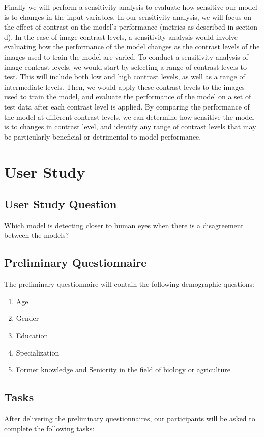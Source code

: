 \documentclass{article}
\begin{document}
Finally we will perform a sensitivity analysis to evaluate how sensitive our model is to changes in the input variables. In our sensitivity analysis, 
we will focus on the effect of contrast on the model’s performance (metrics as described in section d).
In the case of image contrast levels, a sensitivity analysis would involve evaluating how the performance of 
the model changes as the contrast levels of the images used to train the model are varied.
To conduct a sensitivity analysis of image contrast levels, we would start by selecting a range of contrast levels to test. 
This will include both low and high contrast levels, as well as a range of intermediate levels. 
Then, we would apply these contrast levels to the images used to train the model, and evaluate the performance of the model on a set of test data after each contrast level is applied.
By comparing the performance of the model at different contrast levels, we can determine how sensitive the model is to changes in contrast level, 
and identify any range of contrast levels that may be particularly beneficial or detrimental to model performance.

\newpage
\section{User Study}

\subsection{User Study Question}
Which model is detecting closer to human eyes when there is a disagreement between the models? 

\subsection{Preliminary Questionnaire}
The preliminary questionnaire will contain the following demographic questions: 

\begin{enumerate}
    \item Age
    \item Gender
    \item Education
    \item Specialization
    \item Former knowledge and Seniority in the field of biology or agriculture
\end{enumerate}

\subsection{Tasks}
After delivering the preliminary questionnaires, our participants will be asked to complete the following tasks:
\end{document}
